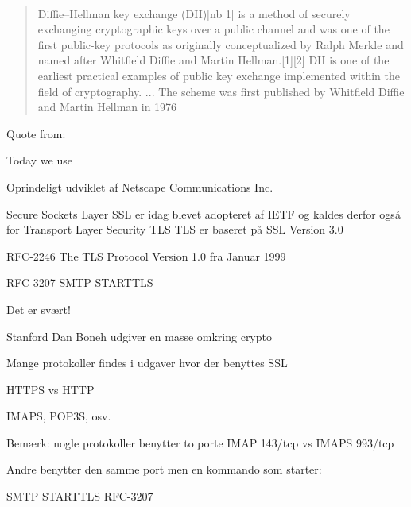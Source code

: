 \documentclass[Screen16to9,17pt]{foils}
\begin{document}

{~}

\begin{quote}
Diffie–Hellman key exchange (DH)[nb 1] is a method of securely exchanging cryptographic keys over a public channel and was one of the first public-key protocols as originally conceptualized by Ralph Merkle and named after Whitfield Diffie and Martin Hellman.[1][2] DH is one of the earliest practical examples of public key exchange implemented within the field of cryptography.
... The scheme was first published by Whitfield Diffie and Martin Hellman in 1976
\end{quote}

\begin{list2}
\item Quote from: {\small {}}
\item Today we use 
\end{list2}




\begin{list1}
\item Oprindeligt udviklet af Netscape Communications Inc.
\item Secure Sockets Layer SSL er idag blevet adopteret af IETF og kaldes
derfor også for Transport Layer Security TLS
TLS er baseret på SSL Version 3.0
\item RFC-2246 The TLS Protocol Version 1.0 fra Januar 1999
\item RFC-3207 SMTP STARTTLS
\item Det er svært!
\item Stanford Dan Boneh udgiver en masse omkring crypto\\ 
\end{list1}





\begin{list1}
\item Mange protokoller findes i udgaver hvor der benyttes SSL
\item HTTPS vs HTTP
\item IMAPS, POP3S, osv.
\item Bemærk: nogle protokoller benytter to porte IMAP 143/tcp vs IMAPS 993/tcp
\item Andre benytter den samme port men en kommando som starter:
\item SMTP STARTTLS RFC-3207
\end{list1}
\end{document}
